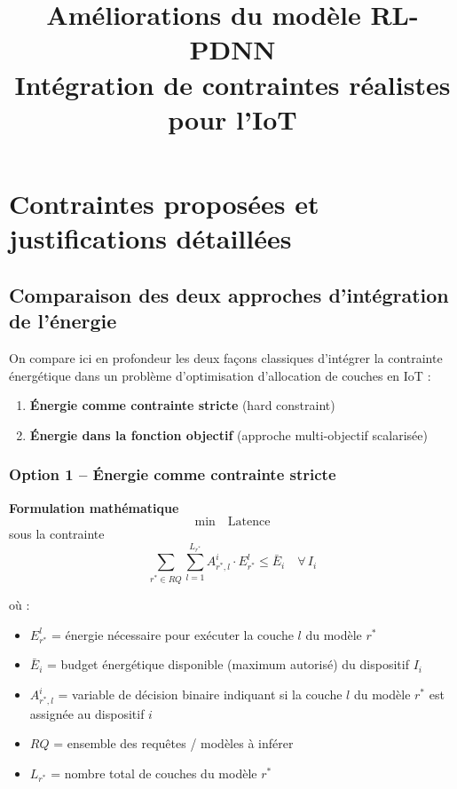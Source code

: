 \documentclass[a4paper,11pt]{article}
\title{Améliorations du modèle RL-PDNN \\ Intégration de contraintes réalistes pour l'IoT}
\author{}
\date{}
\begin{document}
\maketitle

\section{Contraintes proposées et justifications détaillées}

\subsection{Comparaison des deux approches d’intégration de l’énergie}

On compare ici en profondeur les deux façons classiques d’intégrer la contrainte énergétique dans un problème d’optimisation d’allocation de couches en IoT :

\begin{enumerate}[label=\arabic*.]
    \item \textbf{Énergie comme contrainte stricte} (hard constraint)
    \item \textbf{Énergie dans la fonction objectif} (approche multi-objectif scalarisée)
\end{enumerate}

\subsubsection{Option 1 – Énergie comme contrainte stricte}

\textbf{Formulation mathématique}
\[
\min \quad \text{Latence}
\]
sous la contrainte
\begin{equation}
\sum_{r^* \in RQ} \sum_{l=1}^{L_{r^*}} A^i_{r^*,l} \cdot E^l_{r^*} \le \bar{E}_i \quad \forall \, I_i
\label{eq:energie_contrainte}
\end{equation}

où :
\begin{itemize}[leftmargin=*]
    \item $E^l_{r^*}$ \quad = énergie nécessaire pour exécuter la couche $l$ du modèle $r^*$
    \item $\bar{E}_i$ \quad = budget énergétique disponible (maximum autorisé) du dispositif $I_i$
    \item $A^i_{r^*,l}$ \quad = variable de décision binaire indiquant si la couche $l$ du modèle $r^*$ est assignée au dispositif $i$
    \item $RQ$ \quad = ensemble des requêtes / modèles à inférer
    \item $L_{r^*}$ \quad = nombre total de couches du modèle $r^*$
\end{itemize}
\end{document}
